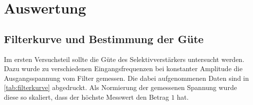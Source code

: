 \section{Auswertung}
\label{sec:Auswertung}

\subsection{Filterkurve und Bestimmung der Güte}
\label{sec:Filterkurve und Bestimmung der Güte}

Im ersten Versuchsteil sollte die Güte des Selektivverstärkers untersucht werden. Dazu
wurde zu verschiedenen Eingangsfrequenzen bei konstanter Amplitude die Ausgangsspannung
vom Filter gemessen. Die dabei aufgenommenen Daten sind in \autoref{tab:filterkurve}
abgedruckt. Als Normierung der gemessenen Spannung wurde diese so skaliert, dass der
höchste Messwert den Betrag $1$ hat.


